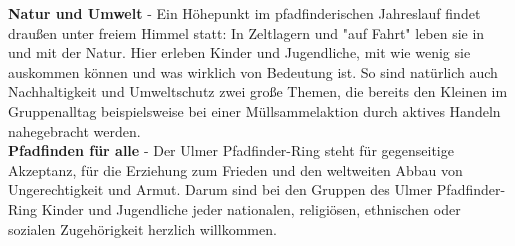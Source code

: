 \textbf{Natur und Umwelt} - Ein Höhepunkt im pfadfinderischen Jahreslauf findet draußen unter 
freiem Himmel statt: In Zeltlagern und "auf Fahrt" leben sie in und mit der Natur. Hier erleben 
Kinder und Jugendliche, mit wie wenig sie auskommen können und was wirklich von Bedeutung ist. So 
sind natürlich auch Nachhaltigkeit und Umweltschutz zwei große Themen, die bereits den Kleinen im 
Gruppenalltag beispielsweise bei einer Müllsammelaktion durch aktives Handeln nahegebracht werden. 
\\

\textbf{Pfadfinden für alle} - Der Ulmer Pfadfinder-Ring steht für gegenseitige Akzeptanz, für die 
Erziehung zum Frieden und den weltweiten Abbau von Ungerechtigkeit und Armut. Darum sind bei den 
Gruppen des Ulmer Pfadfinder-Ring Kinder und Jugendliche jeder nationalen, religiösen, ethnischen 
oder sozialen Zugehörigkeit herzlich willkommen.
